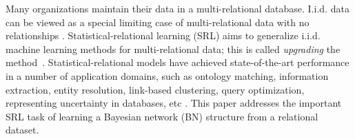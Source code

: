 \documentclass{article}
\begin{document}
Many organizations maintain their data in a multi-relational database.
I.i.d. data %
can be viewed as a special limiting case of multi-relational data with no relationships \cite{Nickel2016}. %
Statistical-relational learning (SRL)
aims to generalize i.i.d. machine learning methods for multi-relational data; this is called {\em upgrading} the method~\cite{SRL2007,Ch.10deraedt}.
Statistical-relational models have achieved state-of-the-art performance in a number of application domains, such as 
ontology matching, information extraction, entity resolution, link-based clustering, query optimization, representing uncertainty in databases, etc %
\cite{Domingos2007,Niu2011,Getoor2001}. %
%
%
This paper addresses the important SRL task of learning a Bayesian network (BN) structure from a relational dataset.
\end{document}

